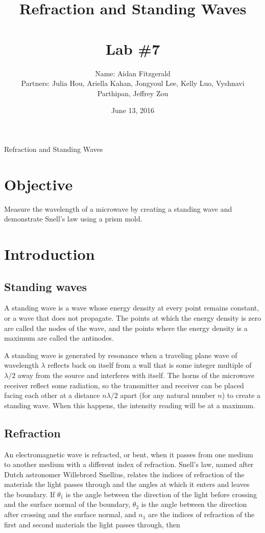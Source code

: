 \documentclass[11pt, titlepage, letterpaper, twoside]{article}
\title{\textbf{Refraction and Standing Waves} \\ \ \\ \large Lab \#7 }
\author{Name: Aidan Fitzgerald \\ Partners: Julia Hou, Ariella Kahan, Jongyoul Lee, Kelly Luo, Vyshnavi Parthipan, Jeffrey Zou}
\date{June 13, 2016}
\begin{document}
\maketitle

\begin{center}
\LARGE Refraction and Standing Waves
\end{center}

\section*{Objective}

Measure the wavelength of a microwave by creating a standing wave and demonstrate Snell's law using a prism mold.

\section{Introduction}

\subsection{Standing waves}

A standing wave is a wave whose energy density at every point remains constant, or a wave that does not propagate.
The points at which the energy density is zero are called the nodes of the wave, and the points where the energy
density is a maximum are called the antinodes.

A standing wave is generated by resonance when a traveling plane wave of wavelength $\lambda$ reflects back on itself
from a wall that is some integer multiple of $\lambda/2$ away from the source and interferes with itself. The horns
of the microwave receiver reflect some radiation, so the transmitter and receiver can be placed facing each other at
a distance $n\lambda/2$ apart (for any natural number $n$) to create a standing wave. When this happens, the intensity
reading will be at a maximum.

\subsection{Refraction}

An electromagnetic wave is refracted, or bent, when it passes from one medium to another medium with a different index
of refraction. Snell's law, named after Dutch astronomer Willebrord Snellius, relates the indices of refraction of the
materials the light passes through and the angles at which it enters and leaves the boundary. If $\theta_1$ is the
angle between the direction of the light before crossing and the surface normal of the boundary, $\theta_2$ is the
angle between the direction after crossing and the surface normal, and $n_1$ are the indices of refraction of the first
and second materials the light passes through, then
\end{document}
